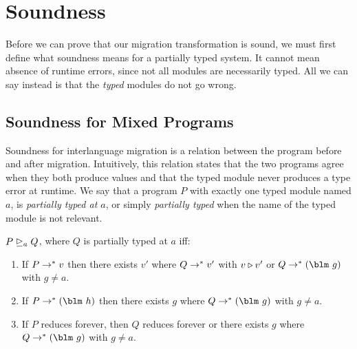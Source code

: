 {
\section{Soundness}

Before we can prove that our migration transformation is sound, we
must first define what soundness means for a partially typed system.
It cannot mean absence of runtime errors, since not all modules are
necessarily typed.  All we can say instead is that the \emph{typed}
modules do not go wrong.

\subsection{Soundness for Mixed Programs}
\renewcommand\tau{a}

Soundness for interlanguage migration is a relation
between the program before and after migration.
  Intuitively, this relation states that the two programs
agree when they both produce values and that the typed module never
produces a type error at runtime.  We say that a program $P$ with exactly one typed module
named $a$, is \emph{partially typed at $a$}, or simply \emph{partially
  typed} when the name of the typed module is not relevant.

\begin{definition}[Soundness]
  $P \trianglerighteq_{a} Q$, where $Q$ is partially typed at $a$ iff:
  \begin{enumerate}
  \item If $P \rightarrow^* v$ then there exists $v'$ where $Q \rightarrow^* v'$ with $v \triangleright v'$ or $Q
    \dlsreduces \blame{g}$ with $g \neq \tau$.
  \item If $P \dlsreduces \blame{h}$ then there exists $g$ where $Q \dlsreduces \blame{g}$
    with $g \neq \tau$.
  \item If $P$ reduces forever, then $Q$ reduces forever or
    there exists $g$ where $Q \dlsreduces \blame{g}$
    with $g \neq \tau$.
  \end{enumerate}
\end{definition}

}
